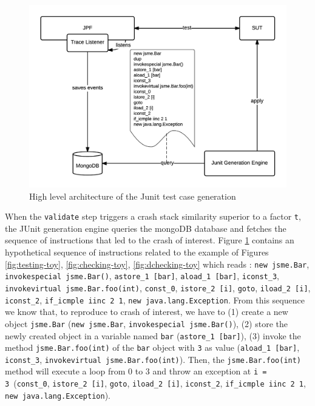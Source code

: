 \documentclass[times]{smrauth}
\begin{document}
\begin{figure}[h!]
  \centering
    \includegraphics[scale=0.8]{media/unittest.png}
    \caption{High level architecture of the Junit test case generation
    \label{fig:jcharming-unittest}}
\end{figure}


When the {\tt validate} step triggers a crash stack similarity superior to a factor {\tt t}, the JUnit generation engine queries the mongoDB database and fetches the sequence of instructions that led to the crash of interest. 
Figure \ref{fig:jcharming-unittest} contains an hypothetical sequence of instructions related to the example of Figures \ref{fig:testing-toy}, \ref{fig:checking-toy}, \ref{fig:dchecking-toy} which reads : {\tt new jsme.Bar}, {\tt invokespecial jsme.Bar()}, {\tt astore\_1 [bar]}, {\tt aload\_1 [bar]}, {\tt iconst\_3}, {\tt invokevirtual jsme.Bar.foo(int)}, {\tt const\_0}, {\tt istore\_2 [i]}, {\tt goto}, {\tt iload\_2 [i]}, {\tt iconst\_2}, {\tt if\_icmple iinc 2 1}, {\tt new java.lang.Exception}. 
From this sequence we know that, to reproduce to crash of interest, we have to (1) create a new object {\tt jsme.Bar} ({\tt new jsme.Bar}, {\tt invokespecial jsme.Bar()}), (2) store the newly created object in a variable named {\tt bar} ({\tt astore\_1 [bar]}), (3) invoke the method {\tt jsme.Bar.foo(int)} of the {\tt bar} object with {\tt 3} as value ({\tt aload\_1 [bar]}, {\tt iconst\_3}, {\tt invokevirtual jsme.Bar.foo(int)}). Then, the {\tt jsme.Bar.foo(int)} method will execute a loop from 0 to 3 and throw an exception at {\tt i = 3}~({\tt const\_0}, {\tt istore\_2 [i]}, {\tt goto}, {\tt iload\_2 [i]}, {\tt iconst\_2}, {\tt if\_icmple iinc 2 1}, {\tt new java.lang.Exception}).  
\end{document}
